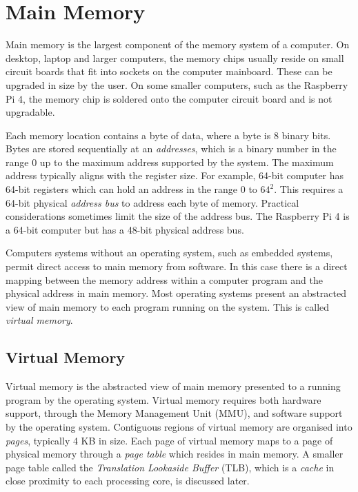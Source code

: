 \documentclass{report}
\begin{document}
%
%
\section{Main Memory}

Main memory is the largest component of the memory system of a computer. On desktop, laptop and larger computers, the memory chips usually reside on small circuit boards that fit into sockets on the computer mainboard. These can be upgraded in size by the user. On some smaller computers, such as the Raspberry Pi 4, the memory chip is soldered onto the computer circuit board and is not upgradable.

Each memory location contains a byte of data, where a byte is 8 binary bits. Bytes are stored sequentially at an \emph{addresses}, which is a binary number in the range 0 up to the maximum address supported by the system. The maximum address typically aligns with the register size. For example, 64-bit computer has 64-bit registers which can hold an address in the range 0 to $64^2$. This requires a 64-bit physical \emph{address bus} to address each byte of memory. Practical considerations sometimes limit the size of the address bus. The Raspberry Pi 4 is a 64-bit computer but has a 48-bit physical address bus.

Computers systems without an operating system, such as embedded systems, permit direct access to main memory from software. In this case there is a direct mapping between the memory address within a computer program and the physical address in main memory. Most operating systems present an abstracted view of main memory to each program running on the system. This is called \emph{virtual memory}.
 
    
\subsection{Virtual Memory}

Virtual memory is the abstracted view of main memory presented to a running program by the operating system. Virtual memory requires both hardware support, through the Memory Management Unit (MMU), and software support by the operating system. Contiguous regions of virtual memory are organised into \emph{pages}, typically 4 KB in size. Each page of virtual memory maps to a page of physical memory through a \emph{page table} which resides in main memory. A smaller page table called the \emph{Translation Lookaside Buffer} (TLB), which is a \emph{cache} in close proximity to each processing core, is discussed later.
\end{document}
